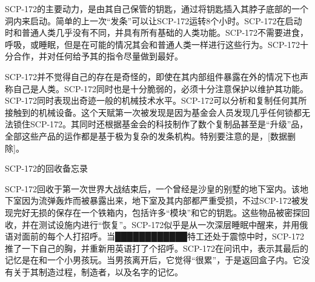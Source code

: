 SCP-172的主要动力，是由其自己保管的钥匙，通过将钥匙插入其脖子底部的一个洞内来启动。简单的上一次“发条”可以让SCP-172运转8个小时。SCP-172在启动时和普通人类几乎没有不同，并具有所有基础的人类功能。SCP-172不需要进食，呼吸，或睡眠，但是在可能的情况其会和普通人类一样进行这些行为。SCP-172十分合作，并对任何给予其的指令尽量做到最好。

SCP-172并不觉得自己的存在是奇怪的，即使在其内部组件暴露在外的情况下也声称自己是人类。SCP-172同时也是十分脆弱的，必须十分注意保护以维护其功能。SCP-172同时表现出奇迹一般的机械技术水平。SCP-172可以分析和复制任何其所接触到的机械设备。这个天赋第一次被发现是因为基金会人员发现几乎任何锁都无法锁住SCP-172。其同时还根据基金会的科技制作了数个复制品甚至是“升级”品，全部这些产品的运作都是基于极为复杂的发条机构。特别要注意的是，{[}数据删除]。

\hr

SCP-172的回收备忘录

SCP-172回收于第一次世界大战结束后，一个曾经是沙皇的别墅的地下室内。该地下室因为流弹轰炸而被暴露出来，地下室及其内部都严重受损，不过SCP-172被发现完好无损的保存在一个铁箱内，包括许多“模块”和它的钥匙。这些物品被密探回收，并在测试设施内进行“恢复”。SCP-172似乎是从一次深层睡眠中醒来，并用俄语对面前的每个人打招呼。当████████████特工还处于震惊中时，SCP-172推了一下自己的胸，并重新用英语打了个招呼。SCP-172在问讯中，表示其最后的记忆是在和一个小男孩玩。当男孩离开后，它觉得“很累”，于是返回盒子内。它没有关于其制造过程，制造者，以及名字的记忆。
